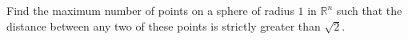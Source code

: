 Find the maximum number of points on a sphere of radius \(1\) in \(\mathbb{R}^n\) such that the distance between any two of these points is strictly greater than \(\sqrt{2}\).